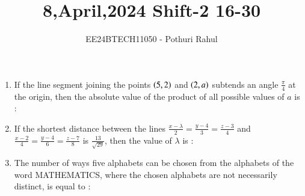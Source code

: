 \documentclass[journal]{IEEEtran}
\begin{document}

\vspace{3cm}
\title{8,April,2024 Shift-2 16-30}
\author{EE24BTECH11050 - Pothuri Rahul}
{\let\newpage\relax\maketitle}
\renewcommand{\thefigure}{\theenumi}
\renewcommand{\thetable}{\theenumi}
\setlength{\intextsep}{10pt} %
\renewcommand{\thetable}{\theenumi}
\begin{enumerate}[start=16]
\item %
If the line segment joining the points $\left(5,2\right)$ and $\left(2,a\right)$ subtends an angle $\frac{\pi}{4}$ at the origin, then the absolute value of the product of all possible values of $a$ is :
\begin{enumerate}
\end{enumerate}
\item %
If the shortest distance between the lines $\frac{x - \lambda}{2} = \frac{y - 4}{3} = \frac{z - 3}{4}$ and $\frac{x - 2}{4} = \frac{y - 4}{6} = \frac{z - 7}{8}$ is $\frac{13}{\sqrt{29}}$, then the value of $\lambda$ is :
\begin{enumerate}
\end{enumerate}
\item %
The number of ways five alphabets can be chosen from the alphabets of the word MATHEMATICS, where the chosen alphabets are not necessarily distinct, is equal to :
\begin{enumerate}
\end{enumerate}
\end{enumerate}
\end{document}

